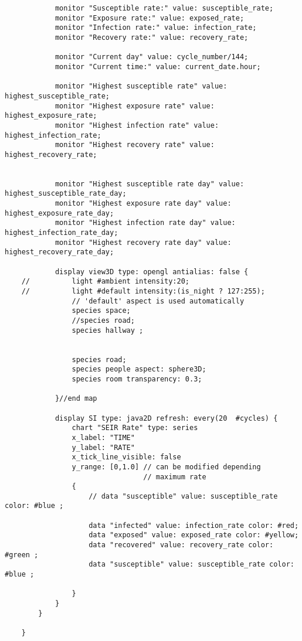 \begin{lstlisting}
            monitor "Susceptible rate:" value: susceptible_rate;
            monitor "Exposure rate:" value: exposed_rate;
            monitor "Infection rate:" value: infection_rate;
            monitor "Recovery rate:" value: recovery_rate;
            
            monitor "Current day" value: cycle_number/144;
            monitor "Current time:" value: current_date.hour;
            
            monitor "Highest susceptible rate" value: highest_susceptible_rate;
            monitor "Highest exposure rate" value: highest_exposure_rate;
            monitor "Highest infection rate" value: highest_infection_rate;
            monitor "Highest recovery rate" value: highest_recovery_rate;
            
            
            monitor "Highest susceptible rate day" value: highest_susceptible_rate_day;
            monitor "Highest exposure rate day" value: highest_exposure_rate_day;
            monitor "Highest infection rate day" value: highest_infection_rate_day;
            monitor "Highest recovery rate day" value: highest_recovery_rate_day;
            
            display view3D type: opengl antialias: false {
    //        	light #ambient intensity:20;
    //        	light #default intensity:(is_night ? 127:255);
                // 'default' aspect is used automatically  
                species space;
                //species road;
                species hallway ;
                
                 
                species road;
                species people aspect: sphere3D; 
                species room transparency: 0.3;
                         
            }//end map
            
            display SI type: java2D refresh: every(20  #cycles) {
                chart "SEIR Rate" type: series 
                x_label: "TIME"
                y_label: "RATE"
                x_tick_line_visible: false
                y_range: [0,1.0] // can be modified depending
                                 // maximum rate
                {
                    // data "susceptible" value: susceptible_rate color: #blue ;
                    
                    data "infected" value: infection_rate color: #red;
                    data "exposed" value: exposed_rate color: #yellow;
                    data "recovered" value: recovery_rate color: #green ;
                    data "susceptible" value: susceptible_rate color: #blue ;
                    
                }
            }
        }
     
    }
    

\end{lstlisting}
\normalsize